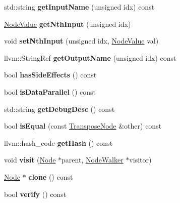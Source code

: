 \begin{DoxyCompactItemize}
std\+::string {\bfseries get\+Input\+Name} (unsigned idx) const
\item 
\mbox{\label{classglow_1_1_transpose_node_a6e1610ba6a400fab5a39d3a510d86b5d}} 
\hyperlink{structglow_1_1_node_value}{Node\+Value} {\bfseries get\+Nth\+Input} (unsigned idx)
\item 
\mbox{\label{classglow_1_1_transpose_node_ac2a24e4a04a379ed41cb67dda66fadfa}} 
void {\bfseries set\+Nth\+Input} (unsigned idx, \hyperlink{structglow_1_1_node_value}{Node\+Value} val)
\item 
\mbox{\label{classglow_1_1_transpose_node_ae00b9068651c44ecd4256000e9f0bd80}} 
llvm\+::\+String\+Ref {\bfseries get\+Output\+Name} (unsigned idx) const
\item 
\mbox{\label{classglow_1_1_transpose_node_a11985f2449356319a48da1100f6afb26}} 
bool {\bfseries has\+Side\+Effects} () const
\item 
\mbox{\label{classglow_1_1_transpose_node_a17da59b4ac842efa4cefcb50f8f52e00}} 
bool {\bfseries is\+Data\+Parallel} () const
\item 
\mbox{\label{classglow_1_1_transpose_node_a52d59d2705d59785547dec80c5467490}} 
std\+::string {\bfseries get\+Debug\+Desc} () const
\item 
\mbox{\label{classglow_1_1_transpose_node_ac0b4c3c2c9b429f2e339d23794e84555}} 
bool {\bfseries is\+Equal} (const \hyperlink{classglow_1_1_transpose_node}{Transpose\+Node} \&other) const
\item 
\mbox{\label{classglow_1_1_transpose_node_a72dd2e87f10cb2aa3f6a4476d9920e35}} 
llvm\+::hash\+\_\+code {\bfseries get\+Hash} () const
\item 
\mbox{\label{classglow_1_1_transpose_node_a99cc8b2db407c5f31cc9fb664061f174}} 
void {\bfseries visit} (\hyperlink{classglow_1_1_node}{Node} $\ast$parent, \hyperlink{classglow_1_1_node_walker}{Node\+Walker} $\ast$visitor)
\item 
\mbox{\label{classglow_1_1_transpose_node_a5a2044262ea0bfd710683100555c7224}} 
\hyperlink{classglow_1_1_node}{Node} $\ast$ {\bfseries clone} () const
\item 
\mbox{\label{classglow_1_1_transpose_node_a93d39ee621f986a79bc6ad9a137216e4}} 
bool {\bfseries verify} () const
\end{DoxyCompactItemize}
